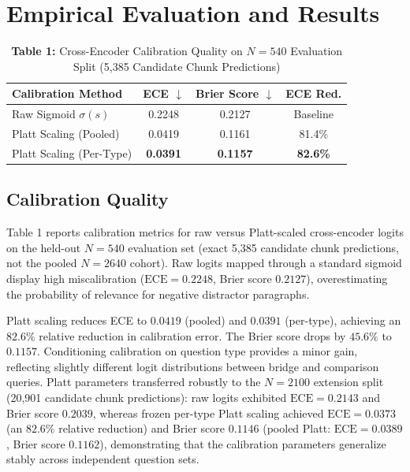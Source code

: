 \documentclass{article}
\begin{document}
\section{Empirical Evaluation and Results}
\label{sec:results}

\begin{table}[t]
\centering
\caption{\textbf{Table 1:} Cross-Encoder Calibration Quality on $N=540$ Evaluation Split (5,385 Candidate Chunk Predictions)}
\label{tab:calibration}
\begin{tabular}{|l|c|c|c|}
\hline
\textbf{Calibration Method} & \textbf{ECE} $\downarrow$ & \textbf{Brier Score} $\downarrow$ & \textbf{ECE Red.} \\
\hline
Raw Sigmoid $\sigma(s)$ & 0.2248 & 0.2127 & Baseline \\
\hline
Platt Scaling (Pooled)  & 0.0419 & 0.1161 & 81.4\% \\
\hline
Platt Scaling (Per-Type) & \textbf{0.0391} & \textbf{0.1157} & \textbf{82.6\%} \\
\hline
\end{tabular}
\end{table}

\subsection{Calibration Quality}
Table 1 reports calibration metrics for raw versus Platt-scaled cross-encoder logits on the held-out $N=540$ evaluation set (exact 5,385 candidate chunk predictions, not the pooled $N=2640$ cohort). Raw logits mapped through a standard sigmoid display high miscalibration ($\text{ECE}=0.2248$, Brier score $0.2127$), overestimating the probability of relevance for negative distractor paragraphs.

Platt scaling reduces ECE to $0.0419$ (pooled) and $0.0391$ (per-type), achieving an $82.6\%$ relative reduction in calibration error. The Brier score drops by $45.6\%$ to $0.1157$. Conditioning calibration on question type provides a minor gain, reflecting slightly different logit distributions between bridge and comparison queries. Platt parameters transferred robustly to the $N=2100$ extension split (20,901 candidate chunk predictions): raw logits exhibited $\text{ECE}=0.2143$ and Brier score $0.2039$, whereas frozen per-type Platt scaling achieved $\text{ECE}=0.0373$ (an $82.6\%$ relative reduction) and Brier score $0.1146$ (pooled Platt: $\text{ECE}=0.0389$, Brier score $0.1162$), demonstrating that the calibration parameters generalize stably across independent question sets.
\end{document}

